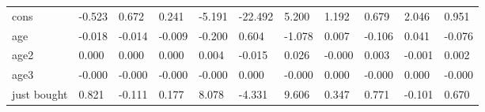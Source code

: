 \begin{table}[htbp]
\begin{tabular}{lllllllllll}
cons &    -0.523 &     0.672 &     0.241 &    -5.191 &   -22.492 &     5.200 &     1.192 &     0.679 &     2.046 &     0.951 \\  
age &    -0.018 &    -0.014 &    -0.009 &    -0.200 &     0.604 &    -1.078 &     0.007 &    -0.106 &     0.041 &    -0.076 \\  
age2 &     0.000 &     0.000 &     0.000 &     0.004 &    -0.015 &     0.026 &    -0.000 &     0.003 &    -0.001 &     0.002 \\  
age3 &    -0.000 &    -0.000 &    -0.000 &    -0.000 &     0.000 &    -0.000 &     0.000 &    -0.000 &     0.000 &    -0.000 \\  
just bought &     0.821 &    -0.111 &     0.177 &     8.078 &    -4.331 &     9.606 &     0.347 &     0.771 &    -0.101 &     0.670 \\  
\hline \hline \end{tabular}
\end{table}
